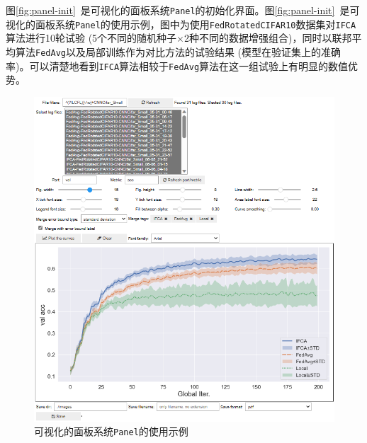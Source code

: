 图\ref{fig:panel-init}~是可视化的面板系统\texttt{Panel}的初始化界面。图\ref{fig:panel-init}~是可视化的面板系统\texttt{Panel}的使用示例，图中为使用\texttt{FedRotatedCIFAR10}数据集对\texttt{IFCA}算法\cite{Ghosh_2022_cfl}进行10轮试验 (5个不同的随机种子$\times$2种不同的数据增强组合)，同时以联邦平均算法\texttt{FedAvg}以及局部训练作为对比方法的试验结果 (模型在验证集上的准确率)。可以清楚地看到\texttt{IFCA}算法相较于\texttt{FedAvg}算法在这一组试验上有明显的数值优势。

\begin{figure}[ht]
    \centering
    \includegraphics[width=\textwidth]{figures/panel-in-use.png}
    \caption{可视化的面板系统\texttt{Panel}的使用示例}
    \label{fig:panel-in-use}
\end{figure}
